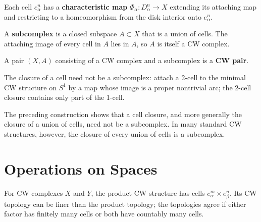 \begin{definition}
\label{def:characteristic-map}
\leanok
{}
Each cell $e^n_\alpha$ has a \textbf{characteristic map}
$\Phi_\alpha:D^n_\alpha\to X$ extending its attaching map and restricting to a
homeomorphism from the disk interior onto $e^n_\alpha$.
\end{definition}

\begin{definition}[Subcomplex]
\label{def:subcomplex}
A \textbf{subcomplex} is a closed subspace $A\subset X$ that is a union of cells.
The attaching image of every cell in $A$ lies in $A$, so $A$ is itself a CW complex.
\end{definition}

\begin{definition}[CW pair]
\label{def:cw-pair}
A pair $(X,A)$ consisting of a CW complex and a subcomplex is a \textbf{CW pair}.
\end{definition}

The closure of a cell need not be a subcomplex: attach a 2-cell to the minimal CW
structure on $S^1$ by a map whose image is a proper nontrivial arc; the 2-cell closure
contains only part of the 1-cell.

\begin{remark}
\label{rem:closure-of-cell-not-always-subcomplex}
The preceding construction shows that a cell closure, and more generally the closure
of a union of cells, need not be a subcomplex. In many standard CW structures,
however, the closure of every union of cells is a subcomplex.
\end{remark}

\section{Operations on Spaces}
\label{sec:operations-on-spaces}

\begin{definition}
\label{def:product-cw-structure}
\leanok
{}
For CW complexes $X$ and $Y$, the product CW structure has cells
$e^m_\alpha\times e^n_\beta$. Its CW topology can be finer than the product topology;
the topologies agree if either factor has finitely many cells or both have countably
many cells.
\end{definition}

